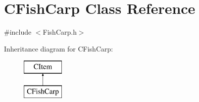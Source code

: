 \hypertarget{class_c_fish_carp}{}\section{C\+Fish\+Carp Class Reference}
\label{class_c_fish_carp}


{\ttfamily \#include $<$Fish\+Carp.\+h$>$}

Inheritance diagram for C\+Fish\+Carp\+:\begin{figure}[H]
\begin{center}
\leavevmode
\includegraphics[height=2.000000cm]{class_c_fish_carp}
\end{center}
\end{figure}
